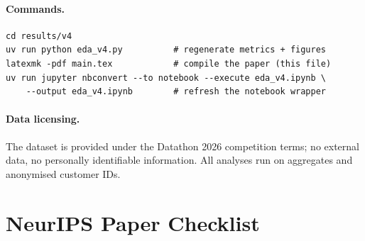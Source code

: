 \documentclass{article}
\begin{document}
\paragraph{Commands.}
\begin{verbatim}
cd results/v4
uv run python eda_v4.py          # regenerate metrics + figures
latexmk -pdf main.tex            # compile the paper (this file)
uv run jupyter nbconvert --to notebook --execute eda_v4.ipynb \
    --output eda_v4.ipynb        # refresh the notebook wrapper
\end{verbatim}

\paragraph{Data licensing.} The dataset is provided under the Datathon 2026 competition terms; no external data, no personally identifiable information. All analyses run on aggregates and anonymised customer IDs.



\newpage
\section*{NeurIPS Paper Checklist}
\end{document}
